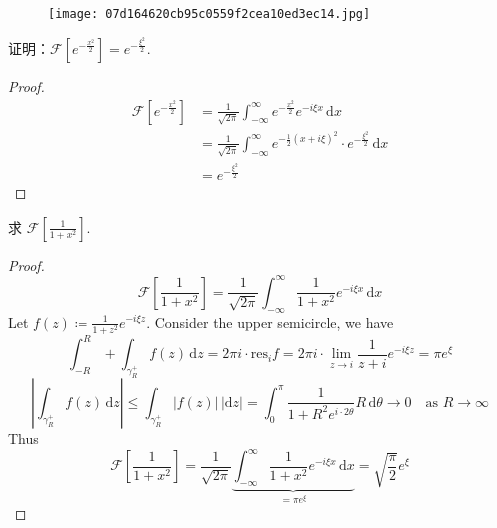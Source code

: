 \begin{figure}[H]
\centering
\texttt{[image: 07d164620cb95c0559f2cea10ed3ec14.jpg]}
\label{}
\end{figure}

\begin{exercise}
证明：$\mathcal{F}\left[ e^{ -\frac{x^2}{2} } \right]=e^{ -\frac{\xi^{2}}{2} }$.
\end{exercise}
\begin{proof}
\[
\begin{aligned}
\mathcal{F}\left[ e^{ -\frac{x^2}{2} } \right] & =\frac{1}{\sqrt{ 2\pi }}\int_{-\infty}^{\infty} e^{ -\frac{x^2}{2} }e^{ -i\xi x } \, \mathrm{d}x \\
 & =\frac{1}{\sqrt{ 2\pi }}\int_{-\infty}^{\infty} e^{ -\frac{1}{2}(x+i\xi)^2 }\cdot e^{ -\frac{\xi^{2}}{2} } \, \mathrm{d}x  \\
 & =e^{ -\frac{\xi^{2}}{2} }
\end{aligned} 
\]
\end{proof}

\begin{exercise}
求 $\mathcal{F}\left[ \frac{1}{1+x^2} \right]$.
\end{exercise}
\begin{proof}
\[
\mathcal{F}\left[ \frac{1}{1+x^2} \right]=\frac{1}{\sqrt{ 2\pi }}\int_{-\infty}^{\infty} \frac{1}{1+x^2}e^{ -i\xi x } \, \mathrm{d}x
\]
Let $f (z)\coloneqq \frac{1}{1+z^2}e^{ -i\xi z }$. Consider the upper semicircle, we have
\[
\int_{-R}^{R} +\int_{\gamma_{R}^{+}} f(z)\, \mathrm{d}z =2\pi i\cdot \mathrm{res}_{i}f=2\pi i\cdot \lim_{ z \to i } \frac{1}{z+i}e^{ -i\xi z }=\pi e^{ \xi }
\]
\[
\left\lvert  \int_{\gamma_{R}^{+}}^{} f(z) \, \mathrm{d}z  \right\rvert  \leq \int_{\gamma_{R}^{+}}^{} \lvert f(z) \rvert  \, \lvert \mathrm{d}z \rvert  =\int_{0}^{\pi} \frac{1}{1+R^2e^{ i\cdot2\theta }}R \, \mathrm{d}\theta\to0\quad \text{as }R\to \infty 
\]
Thus
\[
\mathcal{F}\left[ \frac{1}{1+x^2} \right]=\frac{1}{\sqrt{ 2\pi }}\underbrace{ \int_{-\infty}^{\infty} \frac{1}{1+x^2}e^{ -i\xi x } \, \mathrm{d}x }_{ =\pi e^{ \xi } }=\sqrt{ \frac{\pi}{2} }e^{ \xi }
\]
\end{proof}

